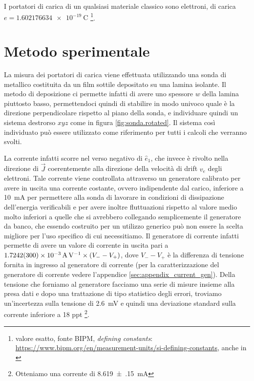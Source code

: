 \documentclass[
    prl,
    reprint, 
    superscriptaddress, 
    altaffilletter, 
    amsmath, 
    amssymb, 
    a4paper,
    varvw]{revtex4-2}
\begin{document}
I portatori di carica di un qualsiasi materiale classico sono elettroni, di carica $e=\SI{1.602176634e-19}{\coulomb}$ \footnote{valore esatto, fonte BIPM, \emph{defining constants}: \url{https://www.bipm.org/en/measurement-units/si-defining-constants}, anche in \cite{Newell_2018}}. 

\section{Metodo sperimentale}
La misura dei portatori di carica viene effettuata utilizzando una sonda di  metallico costituita da un film sottile depositato su una lamina isolante. Il metodo di deposizione ci permette infatti di avere uno spessore $w$ della lamina piuttosto basso, permettendoci quindi di stabilire in modo univoco quale è la direzione perpendicolare rispetto al piano della sonda, e individuare quindi un sistema destrorso $xyz$ come in figura \ref{fig:sonda.rotated}. Il sistema così individuato può essere utilizzato come riferimento per tutti i calcoli che verranno svolti.

La corrente infatti scorre nel verso negativo di $\hat{e}_1$, che invece è rivolto nella direzione di $\vec{J}$ coerentemente alla direzione della velocità di drift $v_e$ degli elettroni. Tale corrente viene controllata attraverso un generatore calibrato per avere in uscita una corrente costante, ovvero indipendente dal carico, inferiore a \SI{10}{\milli\ampere} per permettere alla sonda di lavorare in condizioni di dissipazione dell'energia verificabili e per avere inoltre fluttuazioni rispetto al valore medio molto inferiori a quelle che si avrebbero collegando semplicemente il generatore da banco, che essendo costruito per un utilizzo generico può non essere la scelta migliore per l'uso specifico di cui necessitiamo. Il generatore di corrente infatti permette di avere un valore di corrente in uscita pari a $\SI{1.7242(300)e-3}{\ampere\per\volt}\times\qty(V_--V_+)$, dove $V_--V_+$ è la differenza di tensione fornita in ingresso al generatore di corrente (per la caratterizzazione del generatore di corrente vedere l'appendice \ref{sec:appendix_current_gen}). Della tensione che forniamo al generatore facciamo una serie di misure insieme alla presa dati e dopo una trattazione di tipo statistico degli errori, troviamo un'incertezza sulla tensione di \SI{2.6}{\milli\volt} e quindi una deviazione standard sulla corrente inferiore a 18 ppt \footnote{Otteniamo una corrente di \SI[separate-uncertainty=true]{8.619(150)}{\milli\ampere}}. 
\end{document}
